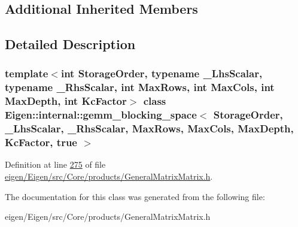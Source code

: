\subsection*{Additional Inherited Members}


\subsection{Detailed Description}
\subsubsection*{template$<$int Storage\+Order, typename \+\_\+\+Lhs\+Scalar, typename \+\_\+\+Rhs\+Scalar, int Max\+Rows, int Max\+Cols, int Max\+Depth, int Kc\+Factor$>$\newline
class Eigen\+::internal\+::gemm\+\_\+blocking\+\_\+space$<$ Storage\+Order, \+\_\+\+Lhs\+Scalar, \+\_\+\+Rhs\+Scalar, Max\+Rows, Max\+Cols, Max\+Depth, Kc\+Factor, true $>$}



Definition at line \hyperlink{eigen_2_eigen_2src_2_core_2products_2_general_matrix_matrix_8h_source_l00275}{275} of file \hyperlink{eigen_2_eigen_2src_2_core_2products_2_general_matrix_matrix_8h_source}{eigen/\+Eigen/src/\+Core/products/\+General\+Matrix\+Matrix.\+h}.



The documentation for this class was generated from the following file\+:\begin{DoxyCompactItemize}
\item 
eigen/\+Eigen/src/\+Core/products/\+General\+Matrix\+Matrix.\+h\end{DoxyCompactItemize}
